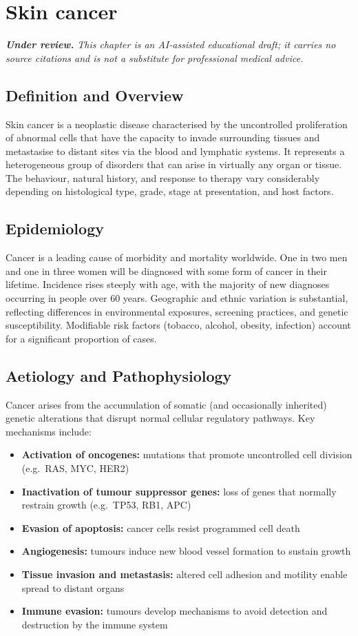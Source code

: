 \chapter{Skin cancer}

\medskip
\noindent\textit{\textbf{Under review.} This chapter is an AI-assisted educational draft; it carries no source citations and is not a substitute for professional medical advice.}

\section*{Definition and Overview}
Skin cancer is a neoplastic disease characterised by the uncontrolled proliferation of abnormal cells that have the capacity to invade surrounding tissues and metastasise to distant sites via the blood and lymphatic systems. It represents a heterogeneous group of disorders that can arise in virtually any organ or tissue. The behaviour, natural history, and response to therapy vary considerably depending on histological type, grade, stage at presentation, and host factors.

\section*{Epidemiology}
Cancer is a leading cause of morbidity and mortality worldwide. One in two men and one in three women will be diagnosed with some form of cancer in their lifetime. Incidence rises steeply with age, with the majority of new diagnoses occurring in people over 60 years. Geographic and ethnic variation is substantial, reflecting differences in environmental exposures, screening practices, and genetic susceptibility. Modifiable risk factors (tobacco, alcohol, obesity, infection) account for a significant proportion of cases.

\section*{Aetiology and Pathophysiology}
Cancer arises from the accumulation of somatic (and occasionally inherited) genetic alterations that disrupt normal cellular regulatory pathways. Key mechanisms include:

\begin{itemize}
    \item \textbf{Activation of oncogenes:} mutations that promote uncontrolled cell division (e.g.\ RAS, MYC, HER2)
    \item \textbf{Inactivation of tumour suppressor genes:} loss of genes that normally restrain growth (e.g.\ TP53, RB1, APC)
    \item \textbf{Evasion of apoptosis:} cancer cells resist programmed cell death
    \item \textbf{Angiogenesis:} tumours induce new blood vessel formation to sustain growth
    \item \textbf{Tissue invasion and metastasis:} altered cell adhesion and motility enable spread to distant organs
    \item \textbf{Immune evasion:} tumours develop mechanisms to avoid detection and destruction by the immune system
\end{itemize}


